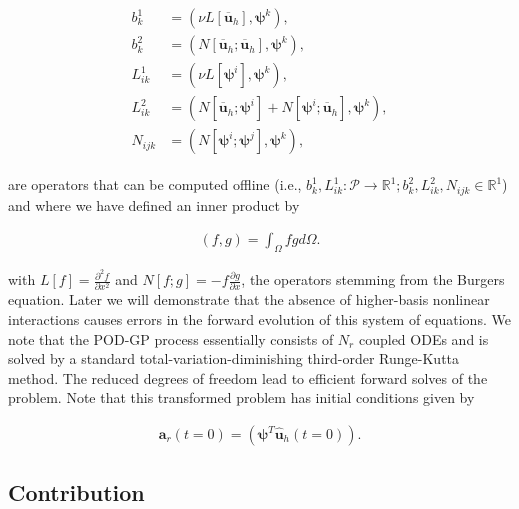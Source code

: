 \documentclass[preprint,12pt]{elsarticle}
\begin{document}
\begin{linenomath*}
\begin{align}
\begin{aligned} 
b_{k}^{1} &=\left(\nu L[\overline{\mathbf{u}}_h], \boldsymbol{\psi}^{k}\right), \\ 
b_{k}^{2} &=\left(N[\overline{\mathbf{u}}_h ; \overline{\mathbf{u}}_h], \boldsymbol{\psi}^{k}\right),  \\ 
L_{i k}^{1} &=\left(\nu L\left[\boldsymbol{\psi}^{i} \right], \boldsymbol{\psi}^{k} \right), \\ 
L_{i k}^{2} &=\left(N\left[\overline{\mathbf{u}}_h ; \boldsymbol{\psi}^{i}\right]+N\left[\boldsymbol{\psi}^{i} ; \overline{\mathbf{u}}_h\right], \boldsymbol{\psi}^{k}\right), \\ 
N_{i j k} &=\left(N\left[\boldsymbol{\psi}^{i} ; \boldsymbol{\psi}^{j}\right], \boldsymbol{\psi}^{k}\right),
\end{aligned}
\end{align}
\end{linenomath*}
are operators that can be computed offline (i.e., $b_k^1, L_{i k}^{1} : \mathcal{P} \rightarrow \mathbb{R}^{1}; b_k^2, L_{i k}^{2}, N_{i j k} \in \mathbb{R}^1$) and where we have defined an inner product by
\begin{linenomath*}
\begin{align}
(f,g) = \int_\Omega fg d\Omega.
\end{align}
\end{linenomath*}
with $L[f] = \frac{\partial^2 f}{\partial x^2}$ and $N[f;g] = -f \frac{\partial g}{\partial x}$, the operators stemming from the Burgers equation. Later we will  demonstrate that the absence of higher-basis nonlinear interactions causes errors in the forward evolution of this system of equations. We note that the POD-GP process essentially consists of $N_r$ coupled ODEs and is solved by a standard total-variation-diminishing third-order Runge-Kutta method. The reduced degrees of freedom lead to efficient forward solves of the problem. Note that this transformed problem has initial conditions given by
\begin{linenomath*}
\begin{align}
\mathbf{a}_r(t=0)=\left(\boldsymbol{\psi}^T \hat{\mathbf{u}}_h(t=0) \right).
\end{align}
\end{linenomath*}

\subsection{Contribution}
\end{document}
